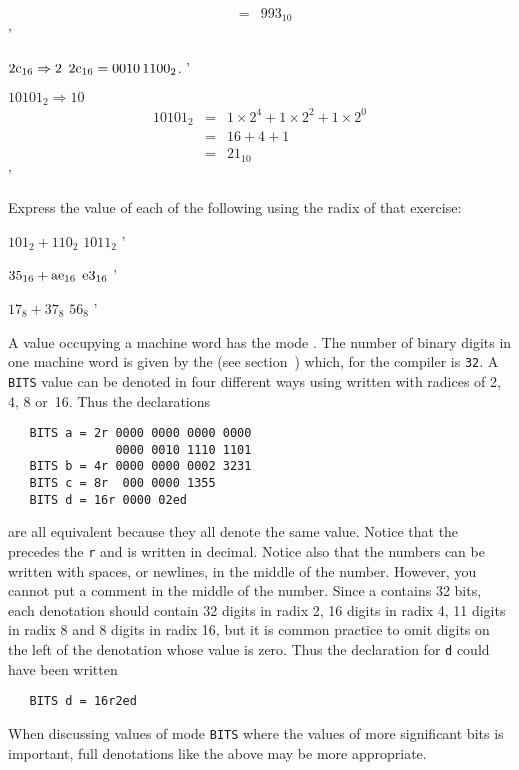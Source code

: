 \begin{exercise}
\begin{subex}
\begin{eqnarray*}
               &=&993_{10}
\end{eqnarray*}
'
\item $2\hbox{c}_{16}\Rightarrow2$ \subans $2\hbox{c}_{16}=0010\,1100_2$.
'
\item $10101_2\Rightarrow10$ \subans \begin{eqnarray*}
10101_2&=&1\times2^4+1\times2^2+1\times2^0\\
       &=&16+4+1\\
       &=&21_{10}
\end{eqnarray*}
'
\end{subex}
\item Express the value of each of the following using the radix of that
exercise:
\begin{subex}
\item $101_2+110_2$ \subans $1011_2$
'
\item $35_{16}+\hbox{ae}_{16}$ \subans $\hbox{e}3_{16}$
'
\item $17_8+37_8$ \subans $56_8$
'
\end{subex}
\end{exercise}

A value occupying a machine word has the mode . The number
of binary digits in one machine word is given by the  (see section~)  which, for
the  compiler is
\verb|32|. A \verb|BITS| value can be denoted in four different ways
using  written with
radices of 2, 4, 8 or~16. Thus the declarations
\begin{verbatim}
   BITS a = 2r 0000 0000 0000 0000
               0000 0010 1110 1101
   BITS b = 4r 0000 0000 0002 3231
   BITS c = 8r  000 0000 1355
   BITS d = 16r 0000 02ed
\end{verbatim}
\noindent
are all equivalent because they all denote the same value.  Notice
that the  precedes the \verb|r| and is written in decimal.
Notice also that the numbers can be written with spaces, or newlines,
in the middle of the number. However, you cannot put a comment in the
middle of the number. Since a  contains 32 bits,
each denotation should contain 32 digits in radix 2, 16 digits in
radix 4, 11 digits in radix 8 and 8 digits in radix 16, but it is
common practice to omit digits on the left of the denotation whose
value is zero.  Thus the declaration for \verb|d| could have been
written
\begin{verbatim}
   BITS d = 16r2ed
\end{verbatim}
\noindent
When discussing values of mode \verb|BITS| where the values of more
significant bits is important, full denotations like the above may be
more appropriate.

